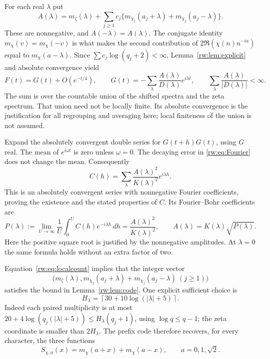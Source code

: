 For each real $\lambda$ put
\begin{equation}\label{rw:eq:amplitude}
 A(\lambda)=m_\zeta(\lambda)+
 \sum_{j\ge1}c_j
 \bigl\{m_{\chi_j}(a_j+\lambda)+m_{\chi_j}(a_j-\lambda)\bigr\}.
\end{equation}
These are nonnegative, and $A(-\lambda)=A(\lambda)$.
The conjugate identity $m_{\bar\chi}(v)=m_\chi(-v)$ is what makes the
second contribution of $2\Re(\chi(n)n^{-ia})$ equal to
$m_\chi(a-\lambda)$.
Since $\sum c_j\log(q_j+2)<\infty$, Lemma~\ref{rw:lem:explicit} and
absolute convergence yield
\begin{equation}\label{rw:eq:Fourier}
 F(t)=G(t)+O(e^{-t/4}),\qquad
 G(t)=-\sum_{\lambda}\frac{A(\lambda)}{D(\lambda)}e^{i\lambda t},
 \qquad
 \sum_\lambda\frac{A(\lambda)}{|D(\lambda)|}<\infty.
\end{equation}
The sum is over the countable union of the shifted spectra and the zeta
spectrum. That union need not be locally finite. Its absolute convergence
is the justification for all regrouping and averaging here; local
finiteness of the union is not assumed.

Expand the absolutely convergent double series for $G(t+h)G(t)$, using
$G$ real. The mean of $e^{i\omega t}$ is zero unless $\omega=0$.
The decaying error in \eqref{rw:eq:Fourier} does not change the mean.
Consequently
\begin{equation}\label{rw:eq:correlation}
 C(h)=\sum_\lambda\frac{A(\lambda)^2}{K(\lambda)^2}e^{i\lambda h}.
\end{equation}
This is an absolutely convergent series with nonnegative Fourier
coefficients, proving the existence and the stated properties of $C$.
Its Fourier--Bohr coefficients are
\begin{equation}\label{rw:eq:decodeA}
 P(\lambda):=\lim_{U\to\infty}\frac1U\int_0^U
 C(h)e^{-i\lambda h}\,dh
 =\frac{A(\lambda)^2}{K(\lambda)^2},\qquad
 A(\lambda)=K(\lambda)\sqrt{P(\lambda)}.
\end{equation}
Here the positive square root is justified by the nonnegative amplitudes.
At $\lambda=0$ the same formula holds without an extra factor of two.

Equation~\eqref{rw:eq:localcount} implies that the integer vector
\[
 \bigl(m_\zeta(\lambda),
 m_{\chi_j}(a_j+\lambda)+m_{\chi_j}(a_j-\lambda)\ (j\ge1)\bigr)
\]
satisfies the bound in Lemma~\ref{rw:lem:code}. One explicit sufficient
choice is
\begin{equation}\label{rw:eq:Hlambda}
 H_\lambda=\left\lceil30+10\log(|\lambda|+5)\right\rceil.
\end{equation}
Indeed each paired multiplicity is at most
$20+4\log(q_j(|\lambda|+5))\le H_\lambda(q_j+1)$, using
$\log q\le q-1$; the zeta coordinate is smaller than $2H_\lambda$.
The prefix code therefore recovers, for every character, the three
functions
\begin{equation}\label{rw:eq:Sa}
 S_{\chi,a}(x)=m_\chi(a+x)+m_\chi(a-x),
 \qquad a=0,1,\sqrt2.
\end{equation}

